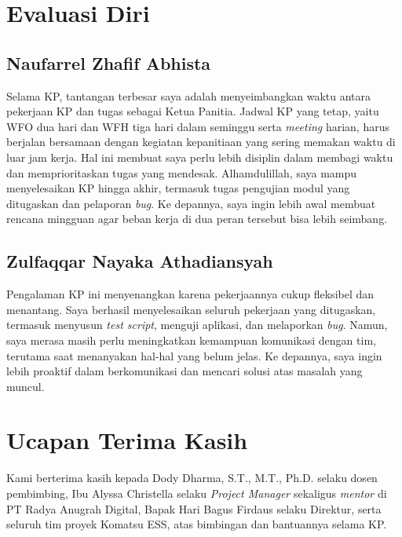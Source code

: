 \section{Evaluasi Diri}
\subsection{Naufarrel Zhafif Abhista}
Selama KP, tantangan terbesar saya adalah menyeimbangkan waktu antara pekerjaan KP dan tugas sebagai Ketua Panitia. Jadwal KP yang tetap, yaitu WFO dua hari dan WFH tiga hari dalam seminggu serta \textit{meeting} harian, harus berjalan bersamaan dengan kegiatan kepanitiaan yang sering memakan waktu di luar jam kerja. Hal ini membuat saya perlu lebih disiplin dalam membagi waktu dan memprioritaskan tugas yang mendesak. Alhamdulillah, saya mampu menyelesaikan KP hingga akhir, termasuk tugas pengujian modul yang ditugaskan dan pelaporan \textit{bug}. Ke depannya, saya ingin lebih awal membuat rencana mingguan agar beban kerja di dua peran tersebut bisa lebih seimbang.

\subsection{Zulfaqqar Nayaka Athadiansyah}
Pengalaman KP ini menyenangkan karena pekerjaannya cukup fleksibel dan menantang. Saya berhasil menyelesaikan seluruh pekerjaan yang ditugaskan, termasuk menyusun \textit{test script}, menguji aplikasi, dan melaporkan \textit{bug}. Namun, saya merasa masih perlu meningkatkan kemampuan komunikasi dengan tim, terutama saat menanyakan hal-hal yang belum jelas. Ke depannya, saya ingin lebih proaktif dalam berkomunikasi dan mencari solusi atas masalah yang muncul.

\section{Ucapan Terima Kasih}
Kami berterima kasih kepada Dody Dharma, S.T., M.T., Ph.D. selaku dosen pembimbing, Ibu Alyssa Christella selaku \textit{Project Manager} sekaligus \textit{mentor} di PT Radya Anugrah Digital, Bapak Hari Bagus Firdaus selaku Direktur, serta seluruh tim proyek Komatsu ESS, atas bimbingan dan bantuannya selama KP.
